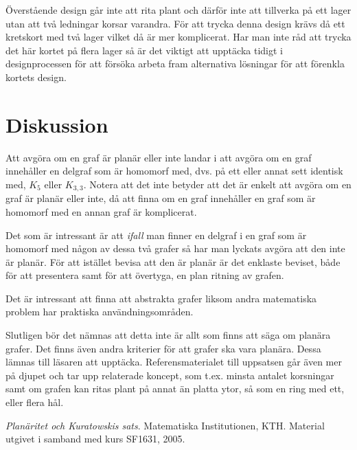 \documentclass[a4paper,11pt]{article}
\begin{document}
Överstående design går inte att rita plant och därför inte att tillverka på ett lager utan att två ledningar korsar varandra. För att trycka denna design krävs då ett kretskort med två lager vilket då är mer komplicerat. Har man inte råd att trycka det här kortet på flera lager så är det viktigt att upptäcka tidigt i designprocessen för att försöka arbeta fram alternativa lösningar för att förenkla kortets design.

\section*{Diskussion}

Att avgöra om en graf är planär eller inte landar i att avgöra om en graf innehåller en delgraf som är homomorf med, dvs. på ett eller annat sett identisk med, $K_5$ eller $K_{3,3}$. Notera att det inte betyder att det är enkelt att avgöra om en graf är planär eller inte, då att finna om en graf innehåller en graf som är homomorf med en annan graf är komplicerat.

Det som är intressant är att \emph{ifall} man finner en delgraf i en graf som är homomorf med någon av dessa två grafer så har man lyckats avgöra att den inte är planär. För att istället bevisa att den är planär är det enklaste beviset, både för att presentera samt för att övertyga, en plan ritning av grafen.

Det är intressant att finna att abstrakta grafer liksom andra matematiska problem har praktiska användningsområden.

Slutligen bör det nämnas att detta inte är allt som finns att säga om planära grafer. Det finns även andra kriterier för att grafer ska vara planära. Dessa lämnas till läsaren att upptäcka. Referensmaterialet till uppsatsen går även mer på djupet och tar upp relaterade koncept, som t.ex. minsta antalet korsningar samt om grafen kan ritas plant på annat än platta ytor, så som en ring med ett, eller flera hål.

\begin{thebibliography}{9}

    \emph{Planäritet och Kuratowskis sats}.
      Matematiska Institutionen, KTH. Material utgivet i samband med kurs SF1631,
	  2005.

	  \end{thebibliography}
\end{document}
